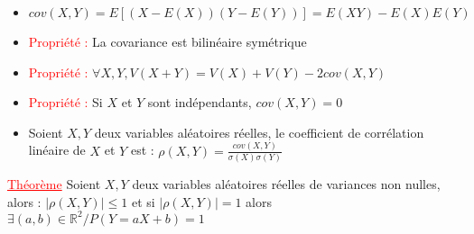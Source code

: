 \documentclass[a4paper, french]{article}
\newcommand{\R}{\mathbb{R}}
\newcommand{\si}{\sigma}
\newcommand{\thm}{\textcolor{red}{\underline{Théorème} }}
\newcommand{\ppt}{\textcolor{red}{Propriété : }}
\begin{document}
	 \begin{itemize}
		  \item $cov(X,Y)=E[(X-E(X))(Y-E(Y))]=E(XY)-E(X)E(Y)$
		  \item \ppt La covariance est bilinéaire symétrique
		 \item \ppt $\forall X,Y, V(X+Y)=V(X)+V(Y)-2cov(X,Y)$
		 \item \ppt Si $X$ et $Y$ sont indépendants, $cov(X,Y)=0$
		 \item Soient $X,Y$ deux variables aléatoires réelles, le coefficient de corrélation linéaire de $X$ et $Y$ est : $\rho(X,Y)=\frac{cov(X,Y)}{\si(X)\si(Y)}$
	 \end{itemize}
	  \thm  Soient $X,Y$ deux variables aléatoires réelles de variances non nulles, alors : ${|\rho(X,Y)|\leqslant1}$ et si $|\rho(X,Y)|=1$ alors $\exists  (a,b) \in \R^2 / P(Y=aX+b)=1$
 
\end{document}
